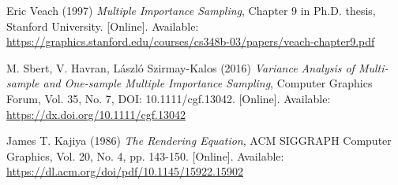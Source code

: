 \documentclass{article}
\begin{document}
\begin{thebibliography}{99}

Eric Veach (1997) \emph{Multiple Importance Sampling}, Chapter 9 in Ph.D. thesis, Stanford University. [Online]. Available: \url{https://graphics.stanford.edu/courses/cs348b-03/papers/veach-chapter9.pdf}

M. Sbert, V. Havran, László Szirmay-Kalos (2016) \emph{Variance Analysis of Multi-sample and One-sample Multiple Importance Sampling}, Computer Graphics Forum, Vol. 35, No. 7, DOI: 10.1111/cgf.13042. [Online]. Available: \url{https://dx.doi.org/10.1111/cgf.13042}

James T. Kajiya (1986) \emph{The Rendering Equation}, ACM SIGGRAPH Computer Graphics, Vol. 20, No. 4, pp. 143-150. [Online]. Available: \url{https://dl.acm.org/doi/pdf/10.1145/15922.15902}

\end{thebibliography}
\end{document}
